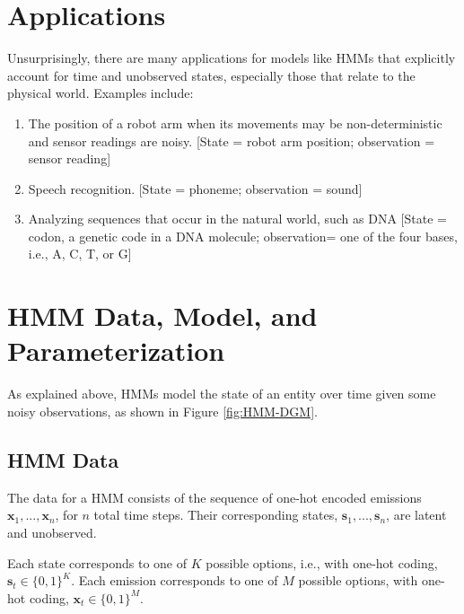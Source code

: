 \section{Applications}

Unsurprisingly, there are many applications for models like HMMs that explicitly account for time and unobserved states, especially those that relate to the physical world. Examples include:
\begin{enumerate}
    \item The position of a robot arm when its movements may be non-deterministic and sensor readings are noisy. [State = robot arm position; observation  = sensor reading]
    \item Speech recognition. [State = phoneme; observation = sound]
    \item Analyzing sequences that occur in the natural world, such as DNA [State = codon, a genetic code in a DNA molecule; observation= one of the four bases, i.e., A, C, T, or G]
\end{enumerate}

\section{HMM Data, Model, and Parameterization}

As explained above, HMMs model the state of an entity over time given some noisy observations, as shown in Figure \ref{fig:HMM-DGM}.

\subsection{HMM Data}

The data for a HMM consists of the sequence of one-hot encoded emissions $\textbf{x}_1, ..., \textbf{x}_n$, for $n$ total time steps. Their corresponding states, $\textbf{s}_1, ..., \textbf{s}_n$, are latent and unobserved.

Each state corresponds to one of $K$ possible options, i.e., with one-hot coding,
$\textbf{s}_t \in \{0,1\}^K$. Each emission corresponds to one of $M$ possible options, with one-hot coding, $\textbf{x}_t \in \{0,1\}^M$.



